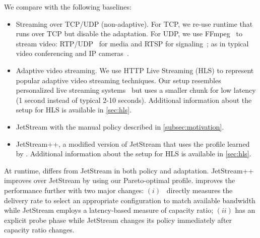 We compare \awstream{} with the following baselines:

\begin{itemize}

\item Streaming over TCP/UDP (non-adaptive). For TCP, we re-use \awstream{}
  runtime that runs over TCP but disable the adaptation. For UDP, we use
  FFmpeg~\cite{bellard2012ffmpeg} to stream video:
  RTP/UDP~\cite{schulzrinne2006rtp} for media and RTSP for
  signaling~\cite{schulzrinne1998rtsp}; as in typical video conferencing and IP
  cameras~\cite{durresi2005rtp, king2009cisco}.

\item Adaptive video streaming. We use HTTP Live Streaming (HLS) to
  represent popular adaptive video streaming techniques. Our setup
  resembles personalized live streaming systems~\cite{wang2016anatomy}
  but uses a smaller chunk for low latency (1 second instead of
  typical 2-10 seconds). Additional information about the setup for
  HLS is available in \autoref{sec:hls}.

\item JetStream with the manual policy described in \autoref{subsec:motivation}.

\item JetStream++, a modified version of JetStream that uses the
  profile learned by \awstream{}. Additional information about the
  setup for HLS is available in \autoref{sec:hls}.

\end{itemize}

At runtime, \awstream{} differs from JetStream in both policy and
adaptation. JetStream++ improves over JetStream by using our Pareto-optimal
profile. \awstream{} improves the performance further with two major changes:
$(i)$~\awstream{} directly measures the delivery rate to select an appropriate
configuration to match available bandwidth while JetStream employs a
latency-based measure of capacity ratio; $(ii)$ \awstream{} has an explicit probe
phase while JetStream changes its policy immediately after capacity ratio
changes.


\captionsetup[subfigure]{justification=justified, singlelinecheck=true}


